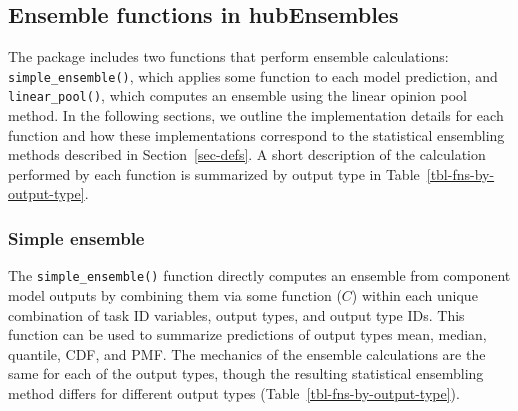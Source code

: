 \documentclass[
  article,
  shortnames,
  notitle]{jss}
\begin{document}
\subsection{Ensemble functions in hubEnsembles}\label{sec-ens-fns}

The  package includes two functions that perform
ensemble calculations: \texttt{simple\_ensemble()}, which applies some
function to each model prediction, and \texttt{linear\_pool()}, which
computes an ensemble using the linear opinion pool method. In the
following sections, we outline the implementation details for each
function and how these implementations correspond to the statistical
ensembling methods described in Section~\ref{sec-defs}. A short
description of the calculation performed by each function is summarized
by output type in Table~\ref{tbl-fns-by-output-type}.

\subsubsection{Simple ensemble}\label{sec-simple-ensemble}

The \texttt{simple\_ensemble()} function directly computes an ensemble
from component model outputs by combining them via some function (\(C\))
within each unique combination of task ID variables, output types, and
output type IDs. This function can be used to summarize predictions of
output types mean, median, quantile, CDF, and PMF. The mechanics of the
ensemble calculations are the same for each of the output types, though
the resulting statistical ensembling method differs for different output
types (Table~\ref{tbl-fns-by-output-type}).
\end{document}
